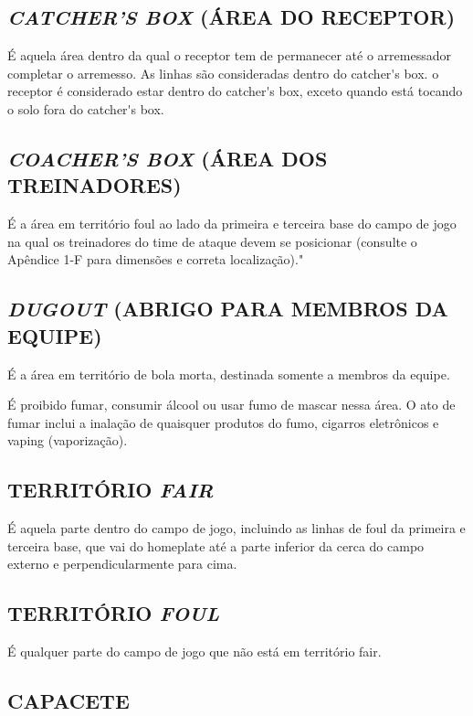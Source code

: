 \subsection{\textit{CATCHER'S BOX} (ÁREA DO RECEPTOR)}
 É aquela área dentro da qual o receptor tem de permanecer até o arremessador completar o arremesso. As linhas são consideradas dentro do \gls{catcher's box}. o receptor é considerado estar dentro do \gls{catcher's box}, exceto quando está tocando o solo fora do \gls{catcher's box}.

\subsection{\textit{COACHER'S BOX} (ÁREA DOS TREINADORES)}
 É a área em território \gls{foul} ao lado da primeira e terceira base do campo de jogo na qual os treinadores do time de ataque devem se posicionar (consulte o Apêndice 1-F para dimensões e correta localização)."

\subsection{\textit{DUGOUT} (ABRIGO PARA MEMBROS DA EQUIPE)}
 É a área em território de bola morta, destinada somente a membros da equipe.

 É proibido fumar, consumir álcool ou usar fumo de mascar nessa área. O ato de fumar inclui a inalação de quaisquer produtos do fumo, cigarros eletrônicos e \gls{vaping} (vaporização).

\subsection{TERRITÓRIO \textit{FAIR}}

 É aquela parte dentro do campo de jogo, incluindo as linhas de \gls{foul} da primeira  e terceira base, que vai do \gls{homeplate} até a parte inferior da cerca do campo externo e perpendicularmente para cima.

\subsection{TERRITÓRIO \textit{FOUL}}
 É qualquer parte do campo de jogo que não está em território \gls{fair}.

\subsection{CAPACETE}

